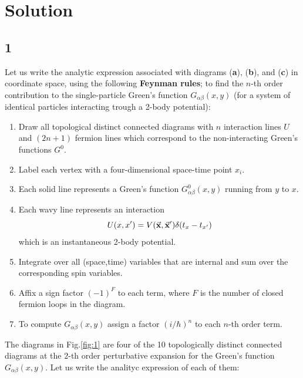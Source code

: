 \documentclass[11pt, a4paper, twoside, openright]{article}
\begin{document}
\section*{Solution}

\subsection*{1}
Let us write the analytic expression associated with diagrams (\textbf{a}), (\textbf{b}), and (\textbf{c}) in coordinate space, using the following \textbf{Feynman rules};
to find the \( n \)-th order contribution to the single-particle Green's function \( G_{\alpha \beta } (x,y) \) (for a system of identical particles interacting trough a 2-body potential):
\begin{enumerate}
\item Draw all topological distinct connected diagrams with \( n \) interaction lines \( U \) and \( (2n+1) \) fermion lines which correspond to the non-interacting Green's functions \( G^0 \).
\item Label each vertex with a four-dimensional space-time point \( x_i \).
\item Each solid line represents a Green's function \( G_{\alpha \beta }^0 (x,y) \) running from \( y \) to \( x \).
\item Each wavy line represents an interaction
\begin{equation*}
  U(x,x') = V(\va{x},\va{x}') \delta (t_x-t_{x'})
\end{equation*}
which is an instantaneous 2-body potential.
\item Integrate over all (space,time) variables that are internal and sum over the corresponding spin variables.

\item Affix a sign factor \( (-1)^F \) to each term, where \( F \) is the number of closed fermion loops in the diagram.

\item To compute \( G_{\alpha \beta }(x,y) \) assign a factor \( (i/\hbar )^n \) to each \( n \)-th order term.
\end{enumerate}

The diagrams in Fig.\ref{fig:1} are four of the 10 topologically distinct connected diagrams at the \( 2 \)-th order perturbative expansion for the Green's function \( G_{\alpha \beta } (x,y) \). Let us write the analityc expression of each of them:
\end{document}
